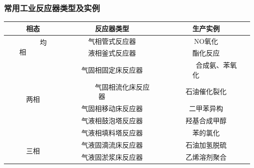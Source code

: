 \documentclass[dvipsnames, svgnames, x11names]{beamer}
\begin{document}


\begin{frame}
    \frametitle{常用工业反应器类型及实例}
\begin{table}[]
    \begin{tabular}{@{}c|c|c@{}}
    \bottomrule
    相态                  & 反应器类型     & 生产实例    \\ \hline
    \multirow{2}{*}{~~~~~~均相~~~~~~} & 气相管式反应器   & NO氧化    \\
                        & 液相釜式反应器   & 酯化反应    \\ \hline
    \multirow{5}{*}{两相} & 气固相固定床反应器 & ~~~~~~合成氨、苯氧化~~~~~~ \\
                        & ~~~~~~气固相流化床反应器~~~~~~ & 石油催化裂化  \\
                        & 气固相移动床反应器 & 二甲苯异构   \\
                        & 气液相鼓泡塔反应器 & 羟基合成甲醇  \\
                        & 气液相填料塔反应器 & 苯的氯化    \\ \hline
    \multirow{2}{*}{三相} & 气液固滴流床反应器 & 石油加氢脱硫  \\
                        & 气液固淤浆床反应器 & 乙烯溶剂聚合  \\ \toprule
    \end{tabular}
    \end{table}
\end{frame}
\end{document}
